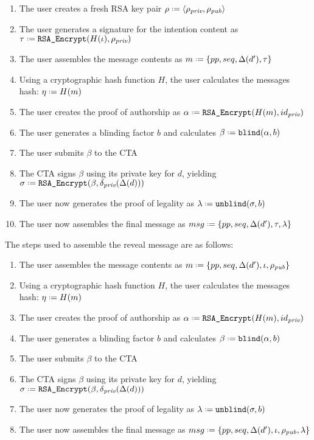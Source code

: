 \begin{enumerate}
\item The user creates a fresh RSA key pair $\rho \defeq \langle \rho_{\textit{priv}}, \rho_{\textit{pub}} \rangle$
\item The user generates a signature for the intention content as $\tau \defeq \texttt{RSA\_Encrypt}(H(\iota), \rho_\textit{priv})$
\item The user assembles the message contents as $m \defeq \{pp, seq, \Delta(d'), \tau \}$ 
\item Using a cryptographic hash function $H$, the user calculates the messages hash: $\eta \defeq H(m)$
\item The user creates the proof of authorship as $\alpha \defeq \texttt{RSA\_Encrypt}(H(m), id_\textit{priv})$
\item The user generates a blinding factor $b$ and calculates $\beta \defeq \texttt{blind}(\alpha, b)$
\item The user submits $\beta$ to the CTA
\item The CTA signs $\beta$ using its private key for $d$, yielding $\sigma\defeq \texttt{RSA\_Encrypt}(\beta,  \delta_\textit{priv}(\Delta(d)))$
\item The user now generates the proof of legality as $\lambda \defeq \texttt{unblind}(\sigma, b)$
\item The user now assembles the final message as $msg \defeq \{pp, seq, \Delta(d'), \tau, \lambda \}$
\end{enumerate}

The steps used to assemble the reveal message are as follows:

\begin{enumerate}
\item The user assembles the message contents as $m \defeq \{pp, seq, \Delta(d'), \iota, \rho_{\textit{pub}}  \}$ 
\item Using a cryptographic hash function $H$, the user calculates the messages hash: $\eta \defeq H(m)$
\item The user creates the proof of authorship as $\alpha \defeq \texttt{RSA\_Encrypt}(H(m), id_\textit{priv})$
\item The user generates a blinding factor $b$ and calculates $\beta \defeq \texttt{blind}(\alpha, b)$
\item The user submits $\beta$ to the CTA
\item The CTA signs $\beta$ using its private key for $d$, yielding $\sigma\defeq \texttt{RSA\_Encrypt}(\beta,  \delta_\textit{priv}(\Delta(d)))$
\item The user now generates the proof of legality as $\lambda \defeq \texttt{unblind}(\sigma, b)$
\item The user now assembles the final message as $msg \defeq \{pp, seq, \Delta(d'), \iota, \rho_{\textit{pub}}, \lambda \}$
\end{enumerate}

